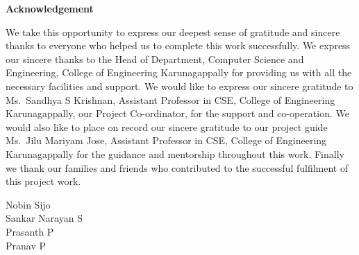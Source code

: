 \thispagestyle{frontmatter}

\begin{center}
    {\Large \textbf{Acknowledgement}}
\end{center}

\vspace{0.6cm}

\hspace{0.5cm} We take this opportunity to express our deepest sense of gratitude and sincere thanks to
everyone who helped us to complete this work successfully. We express our sincere thanks to
the Head of Department, Computer Science and Engineering, College of Engineering
Karunagappally for providing us with all the necessary facilities and support. We would like
to express our sincere gratitude to Ms.\ Sandhya S Krishnan, Assistant Professor in CSE,
College of Engineering Karunagappally, our Project Co-ordinator, for the support and
co-operation. We would also like to place on record our sincere gratitude to our project guide
Ms.\ Jilu Mariyam Jose, Assistant Professor in CSE, College of Engineering Karunagappally
for the guidance and mentorship throughout this work.
Finally we thank our families and friends who contributed to the successful fulfilment of this
project work.\\[2.5cm]

\noindent
\hfill
\begin{minipage}[t]{0.45\textwidth}
    \raggedleft
    Nobin Sijo\\[0.2cm]
    Sankar Narayan S\\[0.2cm]
    Prasanth P\\[0.2cm]
    Pranav P
\end{minipage}
